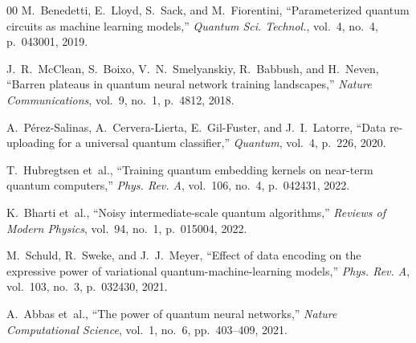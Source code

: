 \documentclass[conference]{IEEEtran}
\begin{document}
\begin{thebibliography}{00}
M.~Benedetti, E.~Lloyd, S.~Sack, and M.~Fiorentini, ``Parameterized quantum circuits as machine learning models,'' \textit{Quantum Sci. Technol.}, vol.~4, no.~4, p.~043001, 2019.

J.~R.~McClean, S.~Boixo, V.~N.~Smelyanskiy, R.~Babbush, and H.~Neven, ``Barren plateaus in quantum neural network training landscapes,'' \textit{Nature Communications}, vol.~9, no.~1, p.~4812, 2018.

A.~P\'{e}rez-Salinas, A.~Cervera-Lierta, E.~Gil-Fuster, and J.~I.~Latorre, ``Data re-uploading for a universal quantum classifier,'' \textit{Quantum}, vol.~4, p.~226, 2020.

T.~Hubregtsen et~al., ``Training quantum embedding kernels on near-term quantum computers,'' \textit{Phys. Rev. A}, vol.~106, no.~4, p.~042431, 2022.

K.~Bharti et~al., ``Noisy intermediate-scale quantum algorithms,'' \textit{Reviews of Modern Physics}, vol.~94, no.~1, p.~015004, 2022.

M.~Schuld, R.~Sweke, and J.~J.~Meyer, ``Effect of data encoding on the expressive power of variational quantum-machine-learning models,'' \textit{Phys. Rev. A}, vol.~103, no.~3, p.~032430, 2021.

A.~Abbas et~al., ``The power of quantum neural networks,'' \textit{Nature Computational Science}, vol.~1, no.~6, pp.~403--409, 2021.

\end{thebibliography}
\end{document}
